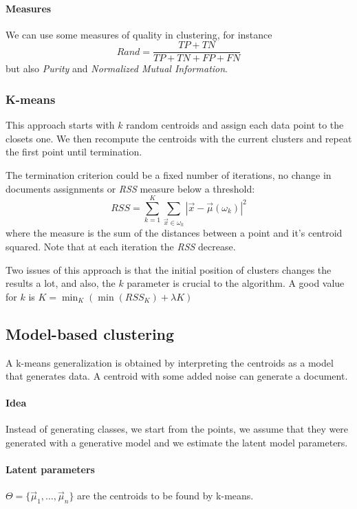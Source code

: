 \paragraph{Measures}
We can use some measures of quality in clustering, 
for instance 
$$\mathit{Rand} = \frac{\mathit{TP} + \mathit{TN}}{\mathit{TP} + \mathit{TN} + \mathit{FP} + \mathit{FN}}$$
but also \emph{Purity} and \emph{Normalized Mutual Information}.

\subsubsection{K-means}
This approach starts with $k$ random centroids and assign each data point 
to the closets one. We then recompute the centroids with the current clusters 
and repeat the first point until termination.

The termination criterion could be a fixed number of iterations, no change 
in documents assignments or \emph{RSS} measure below a threshold:
$$\mathit{RSS} = \sum_{k=1}^K\sum_{\vec{x} \in \omega_k}|\vec{x} - \vec{\mu}(\omega_k)|^2$$
where the measure is the sum of the distances between a point and it's centroid squared.
Note that at each iteration the \emph{RSS} decrease.

Two issues of this approach is that the initial position of clusters
changes the results a lot, and also, the $k$ parameter is crucial to the 
algorithm.
A good value for $k$ is $K = \min_K(\min(\mathit{RSS}_K) + \lambda K )$

\subsection{Model-based clustering}
A k-means generalization is obtained by interpreting the centroids as a model 
that generates data. A centroid with some added noise can generate a document.

\paragraph{Idea}
Instead of generating classes, we start from the points, 
we assume that they were generated with a generative model 
and we estimate the latent model parameters.

\paragraph{Latent parameters}
$\Theta = \{ \vec{\mu}_1, \dots, \vec{\mu}_n\}$ are the centroids 
to be found by k-means.

